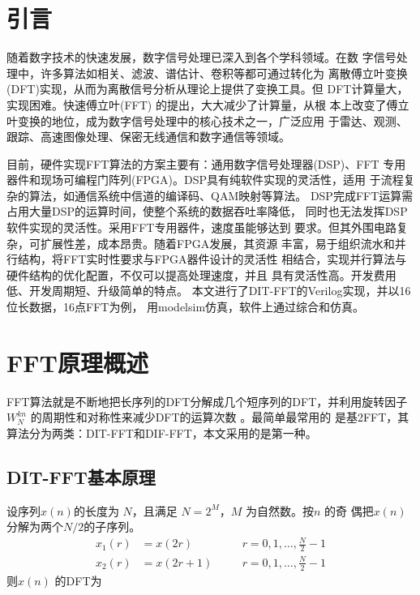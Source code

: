 
\chapter{引言}%

随着数字技术的快速发展，数字信号处理已深入到各个学科领域。在数
字信号处理中，许多算法如相关、滤波、谱估计、卷积等都可通过转化为
离散傅立叶变换(DFT)实现，从而为离散信号分析从理论上提供了变换工具。但
    DFT计算量大，实现困难。快速傅立叶(FFT)\cite{fft} 的提出，大大减少了计算量，从根
本上改变了傅立叶变换的地位，成为数字信号处理中的核心技术之一，广泛应用
于雷达、观测、跟踪、高速图像处理、保密无线通信和数字通信等领域。

目前，硬件实现FFT算法的方案主要有：通用数字信号处理器(DSP)、FFT
专用器件和现场可编程门阵列(FPGA)。DSP具有纯软件实现的灵活性，适用
于流程复杂的算法，如通信系统中信道的编译码、QAM映射等算法。
DSP完成FFT运算需占用大量DSP的运算时间，使整个系统的数据吞吐率降低，
同时也无法发挥DSP软件实现的灵活性。采用FFT专用器件，速度虽能够达到
要求。但其外围电路复杂，可扩展性差，成本昂贵。随着FPGA发展，其资源
丰富，易于组织流水和并行结构，将FFT实时性要求与FPGA器件设计的灵活性
相结合，实现并行算法与硬件结构的优化配置，不仅可以提高处理速度，并且
具有灵活性高。开发费用低、开发周期短、升级简单的特点。
本文进行了DIT-FFT的Verilog实现，并以16位长数据，16点FFT为例，
用modelsim仿真，软件上通过综合和仿真。

\chapter{FFT原理概述}

FFT算法就是不断地把长序列的DFT分解成几个短序列的DFT，并利用旋转因子
$W_N^{kn}$ 的周期性和对称性来减少DFT的运算次数\cite{dsp} 。最简单最常用的
是基2FFT，其算法分为两类：DIT-FFT和DIF-FFT，本文采用的是第一种。

\section{DIT-FFT基本原理}

设序列$x(n)$的长度为 $N$，且满足 $N=2^M$，$M$ 为自然数。按$n$ 的奇
偶把$x(n)$ 分解为两个$N /2$的子序列。
 \begin{equation*}
    \begin{aligned}
        x_1(r)&=x(2r)& \quad &r=0,1,\dots,\frac{N}{2}-1\\
        x_2(r)&=x(2r+1)& &r=0,1,\dots,\frac{N}{2}-1
    \end{aligned}
\end{equation*}
则$x(n)$ 的DFT为

